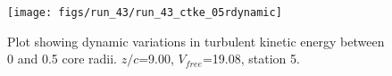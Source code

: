 \begin{figure}[H]
\centering
\texttt{[image: figs/run\_43/run\_43\_ctke\_05rdynamic]}
\caption{Plot showing dynamic variations in turbulent kinetic energy between 0 and 0.5 core radii. $z/c$=9.00, $V_{free}$=19.08, station 5.}
\label{fig:run_43_ctke_05rdynamic}
\end{figure}


